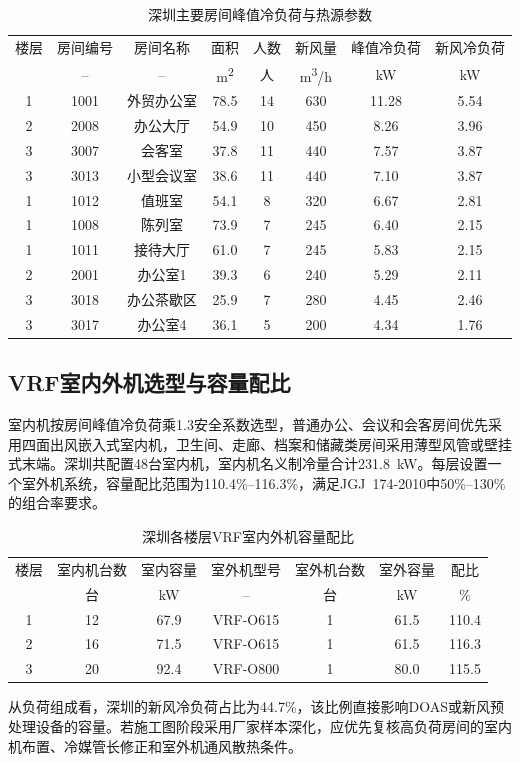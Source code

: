 \begin{table}[!htbp]
\centering
\caption{深圳主要房间峰值冷负荷与热源参数}
\label{tab:shenzhen-top-rooms}
\begin{tabular}{@{}cccccccc@{}}
\toprule
楼层 & 房间编号 & 房间名称 & 面积 & 人数 & 新风量 & 峰值冷负荷 & 新风冷负荷 \\
 & -- & -- & \si{m^2} & 人 & \si{m^3/h} & \si{kW} & \si{kW} \\
\midrule
1 & 1001 & 外贸办公室 & 78.5 & 14 & 630 & 11.28 & 5.54 \\
2 & 2008 & 办公大厅 & 54.9 & 10 & 450 & 8.26 & 3.96 \\
3 & 3007 & 会客室 & 37.8 & 11 & 440 & 7.57 & 3.87 \\
3 & 3013 & 小型会议室 & 38.6 & 11 & 440 & 7.10 & 3.87 \\
1 & 1012 & 值班室 & 54.1 & 8 & 320 & 6.67 & 2.81 \\
1 & 1008 & 陈列室 & 73.9 & 7 & 245 & 6.40 & 2.15 \\
1 & 1011 & 接待大厅 & 61.0 & 7 & 245 & 5.83 & 2.15 \\
2 & 2001 & 办公室1 & 39.3 & 6 & 240 & 5.29 & 2.11 \\
3 & 3018 & 办公茶歇区 & 25.9 & 7 & 280 & 4.45 & 2.46 \\
3 & 3017 & 办公室4 & 36.1 & 5 & 200 & 4.34 & 1.76 \\
\bottomrule
\end{tabular}
\end{table}

\subsection{VRF室内外机选型与容量配比}

室内机按房间峰值冷负荷乘1.3安全系数选型，普通办公、会议和会客房间优先采用四面出风嵌入式室内机，卫生间、走廊、档案和储藏类房间采用薄型风管或壁挂式末端。深圳共配置48台室内机，室内机名义制冷量合计\SI{231.8}{kW}。每层设置一个室外机系统，容量配比范围为110.4\%--116.3\%，满足JGJ~174-2010中50\%--130\%的组合率要求。

\begin{table}[!htbp]
\centering
\caption{深圳各楼层VRF室内外机容量配比}
\label{tab:shenzhen-vrf-ratio}
\begin{tabular}{@{}ccccccc@{}}
\toprule
楼层 & 室内机台数 & 室内容量 & 室外机型号 & 室外机台数 & 室外容量 & 配比 \\
 & 台 & \si{kW} & -- & 台 & \si{kW} & \% \\
\midrule
1 & 12 & 67.9 & VRF-O615 & 1 & 61.5 & 110.4 \\
2 & 16 & 71.5 & VRF-O615 & 1 & 61.5 & 116.3 \\
3 & 20 & 92.4 & VRF-O800 & 1 & 80.0 & 115.5 \\
\bottomrule
\end{tabular}
\end{table}

从负荷组成看，深圳的新风冷负荷占比为44.7\%，该比例直接影响DOAS或新风预处理设备的容量。若施工图阶段采用厂家样本深化，应优先复核高负荷房间的室内机布置、冷媒管长修正和室外机通风散热条件。
